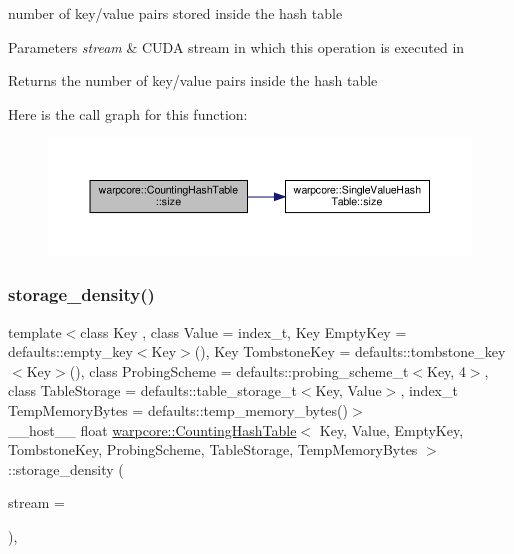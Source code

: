 number of key/value pairs stored inside the hash table 


\begin{DoxyParams}{Parameters}
{\em stream} & C\+U\+DA stream in which this operation is executed in \\
\hline
\end{DoxyParams}
\begin{DoxyReturn}{Returns}
the number of key/value pairs inside the hash table 
\end{DoxyReturn}
Here is the call graph for this function\+:
\nopagebreak
\begin{figure}[H]
\begin{center}
\leavevmode
\includegraphics[width=350pt]{classwarpcore_1_1CountingHashTable_a3ea12f2cb1fb21743f91014b78221321_cgraph}
\end{center}
\end{figure}
\mbox{\label{classwarpcore_1_1CountingHashTable_a8ffc638d6747fdb66cfa9500e46f705c}} 
\subsubsection{\texorpdfstring{storage\+\_\+density()}{storage\_density()}}
{\footnotesize\ttfamily template$<$class Key , class Value  = index\+\_\+t, Key Empty\+Key = defaults\+::empty\+\_\+key$<$\+Key$>$(), Key Tombstone\+Key = defaults\+::tombstone\+\_\+key$<$\+Key$>$(), class Probing\+Scheme  = defaults\+::probing\+\_\+scheme\+\_\+t$<$\+Key, 4$>$, class Table\+Storage  = defaults\+::table\+\_\+storage\+\_\+t$<$\+Key, Value$>$, index\+\_\+t Temp\+Memory\+Bytes = defaults\+::temp\+\_\+memory\+\_\+bytes()$>$ \\
\+\_\+\+\_\+host\+\_\+\+\_\+ float \hyperlink{classwarpcore_1_1CountingHashTable}{warpcore\+::\+Counting\+Hash\+Table}$<$ Key, Value, Empty\+Key, Tombstone\+Key, Probing\+Scheme, Table\+Storage, Temp\+Memory\+Bytes $>$\+::storage\+\_\+density (\begin{DoxyParamCaption}\item[{cuda\+Stream\+\_\+t}]{stream = {} }\end{DoxyParamCaption})\hspace{0.3cm}{\ttfamily [inline]}, {\ttfamily [noexcept]}}



